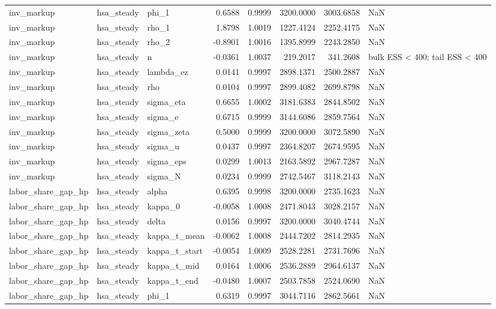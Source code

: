 \begin{tabular}{lllrrrrl}
inv\_markup & hsa\_steady & phi\_1 & 0.6588 & 0.9999 & 3200.0000 & 3003.6858 & NaN \\
inv\_markup & hsa\_steady & rho\_1 & 1.8798 & 1.0019 & 1227.4124 & 2252.4175 & NaN \\
inv\_markup & hsa\_steady & rho\_2 & -0.8901 & 1.0016 & 1395.8999 & 2243.2850 & NaN \\
inv\_markup & hsa\_steady & n & -0.0361 & 1.0037 & 219.2017 & 341.2608 & bulk ESS < 400; tail ESS < 400 \\
inv\_markup & hsa\_steady & lambda\_ez & 0.0141 & 0.9997 & 2898.1371 & 2500.2887 & NaN \\
inv\_markup & hsa\_steady & rho & 0.0104 & 0.9997 & 2899.4082 & 2699.8798 & NaN \\
inv\_markup & hsa\_steady & sigma\_eta & 0.6655 & 1.0002 & 3181.6383 & 2844.8502 & NaN \\
inv\_markup & hsa\_steady & sigma\_e & 0.6715 & 0.9999 & 3144.6086 & 2859.7564 & NaN \\
inv\_markup & hsa\_steady & sigma\_zeta & 0.5000 & 0.9999 & 3200.0000 & 3072.5890 & NaN \\
inv\_markup & hsa\_steady & sigma\_u & 0.0437 & 0.9997 & 2364.8207 & 2674.9595 & NaN \\
inv\_markup & hsa\_steady & sigma\_eps & 0.0299 & 1.0013 & 2163.5892 & 2967.7287 & NaN \\
inv\_markup & hsa\_steady & sigma\_N & 0.0234 & 0.9999 & 2742.5467 & 3118.2143 & NaN \\
labor\_share\_gap\_hp & hsa\_steady & alpha & 0.6395 & 0.9998 & 3200.0000 & 2735.1623 & NaN \\
labor\_share\_gap\_hp & hsa\_steady & kappa\_0 & -0.0058 & 1.0008 & 2471.8043 & 3028.2157 & NaN \\
labor\_share\_gap\_hp & hsa\_steady & delta & 0.0156 & 0.9997 & 3200.0000 & 3040.4744 & NaN \\
labor\_share\_gap\_hp & hsa\_steady & kappa\_t\_mean & -0.0062 & 1.0008 & 2444.7202 & 2814.2935 & NaN \\
labor\_share\_gap\_hp & hsa\_steady & kappa\_t\_start & -0.0054 & 1.0009 & 2528.2281 & 2731.7696 & NaN \\
labor\_share\_gap\_hp & hsa\_steady & kappa\_t\_mid & 0.0164 & 1.0006 & 2536.2889 & 2964.6137 & NaN \\
labor\_share\_gap\_hp & hsa\_steady & kappa\_t\_end & -0.0480 & 1.0007 & 2503.7858 & 2524.0690 & NaN \\
labor\_share\_gap\_hp & hsa\_steady & phi\_1 & 0.6319 & 0.9997 & 3044.7116 & 2862.5661 & NaN \\

\end{tabular}

